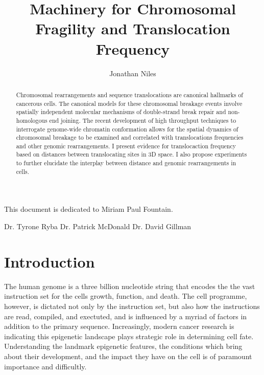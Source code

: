 \documentclass[phd,tocprelim]{cornell}
\title{Machinery for Chromosomal Fragility and Translocation Frequency}
\author{Jonathan Niles}
\begin{document}
\maketitle
\makecopyright

\begin{abstract}
Chromosomal rearrangements and sequence translocations are
canonical hallmarks of cancerous cells.  The canonical models
for these chromosomal breakage events involve spatially
independent molecular mechanisms of double-strand break
repair and non-homologous end joining.  The recent development of high
throughput techniques to interrogate genome-wide chromatin
conformation allows for the spatial dynamics of chromosomal
breakage to be examined and correlated with translocations
frequencies and other genomic rearrangements.  I present
evidence for translocaction frequency based on distances between
translocating sites in 3D space.  I also propose experiments
to further elucidate the interplay between distance and
genomic rearrangements in cells.
\end{abstract}

\begin{dedication}
This document is dedicated to Miriam Paul Fountain.
\end{dedication}

\begin{acknowledgements}
Dr. Tyrone Ryba
Dr. Patrick McDonald
Dr. David Gillman
\end{acknowledgements}

\contentspage
\tablelistpage
\figurelistpage

\normalspacing \setcounter{page}{1} 
\pagestyle{cornell} \addtolength{\parskip}{0.5\baselineskip}

\chapter{Introduction}

The human genome is a three billion nucleotide string that encodes the
the vast instruction set for the cells growth, function, and death.  The cell
programme, however, is dictated not only by the instruction set, but also
how the instructions are read, compiled, and exectuted, and is influenced
by a myriad of factors in addition to the primary sequence.  Increasingly,
modern cancer research is indicating this epigenetic landscape plays strategic
role in determining cell fate.  Understanding the landmark epigenetic features,
the conditions which bring about their development, and the impact they have on
the cell is of paramount importance and difficultly.
\end{document}
